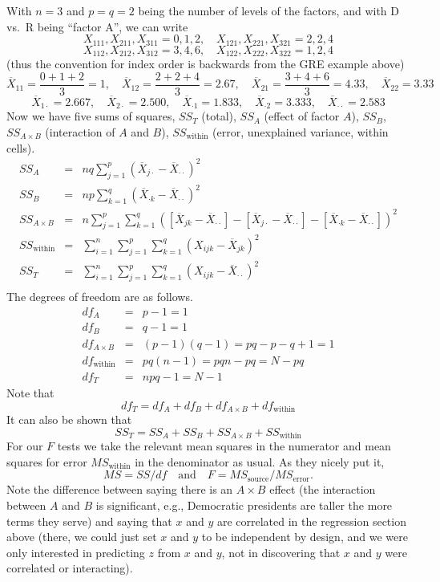 With $n=3$ and $p=q=2$ being the number of levels of the factors, and with D vs.~R being ``factor A'', we can write
\[
	X_{111},X_{211},X_{311}=0,1,2,\quad X_{121},X_{221},X_{321}=2,2,4
\]
\[
	X_{112},X_{212},X_{312}=3,4,6,\quad X_{122},X_{222},X_{322}=1,2,4
\]
(thus the convention for index order is backwards from the GRE example above)
\[
	\overline X_{11}=\frac{0+1+2}3=1,\quad \overline X_{12}=\frac{2+2+4}3=2.67,\quad\overline X_{21}=\frac{3+4+6}3=4.33,\quad \overline X_{22}=3.33
\]
\[
	\overline X_{1\cdot} = 2.667,\quad \overline X_{2\cdot}=2.500,\quad \overline X_{\cdot 1}=1.833,\quad \overline X_{\cdot 2}=3.333,\quad \overline X_{\cdot\cdot} = 2.583
\]
Now we have five sums of squares, $SS_T$ (total), $SS_A$ (effect of factor $A$), $SS_B$, $SS_{A\times B}$ (interaction of $A$ and $B$), $SS_{\text{within}}$ (error, unexplained variance, within cells).
\begin{eqnarray*}
	SS_A			&=& nq \sum_{j=1}^p (\overline X_{j\cdot}-\overline X_{\cdot\cdot})^2\\
	SS_B			&=& np \sum_{k=1}^q (\overline X_{\cdot k}-\overline X_{\cdot\cdot})^2\\
	SS_{A\times B} 	&=& n \sum_{j=1}^p\sum_{k=1}^q ([\overline X_{jk}-\overline X_{\cdot\cdot}] - [\overline X_{j\cdot}-\overline X_{\cdot\cdot}] - [\overline X_{\cdot k}-\overline X_{\cdot\cdot}] )^2\\
	SS_{\text{within}} 	&=& \sum_{i=1}^n \sum_{j=1}^p\sum_{k=1}^q (X_{ijk}-\overline X_{jk})^2\\
	SS_T			&=& \sum_{i=1}^n \sum_{j=1}^p\sum_{k=1}^q (X_{ijk}-\overline X_{\cdot\cdot})^2\\
\end{eqnarray*}
The degrees of freedom are as follows.
\begin{eqnarray*}
	df_A				&=& p-1=1\\
	df_B				&=& q-1=1\\
	df_{A\times B}		&=& (p-1)(q-1)=pq-p-q+1=1\\
	df_{\text{within}}	&=& pq(n-1)=pqn-pq=N-pq\\
	df_T				&=& npq-1=N-1
\end{eqnarray*}
Note that
\[
	df_T = df_A + df_B + df_{A\times B} + df_{\text{within}}
\]
It can also be shown that
\[
	SS_T = SS_A + SS_B + SS_{A\times B} + SS_{\text{within}}
\]
For our $F$ tests we take the relevant mean squares in the numerator and mean squares for error $MS_{\text{within}}$ in the denominator as usual. As they nicely put it,
\[
	MS=SS/df\quad \text{and} \quad F=MS_{\text{source}}/MS_{\text{error}}.
\]
Note the difference between saying there is an $A\times B$ effect (the interaction between $A$ and $B$ is significant, e.g., Democratic presidents are taller the more terms they serve) and saying that $x$ and $y$ are correlated in the regression section above (there, we could just set $x$ and $y$ to be independent by design, and we were only interested in predicting $z$ from $x$ and $y$, not in discovering that $x$ and $y$ were correlated or interacting).

